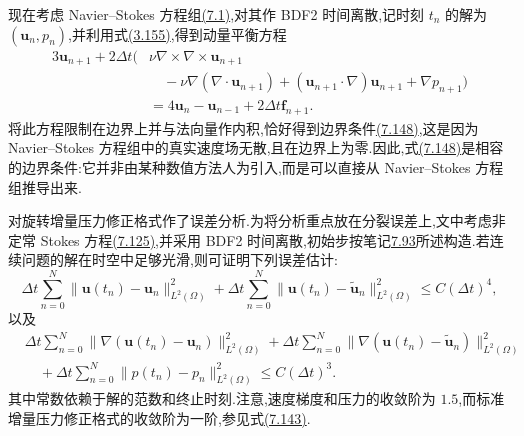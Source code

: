 \begin{note}[旋转增量压力修正格式]
现在考虑 Navier--Stokes 方程组\hyperref[eq:time-dependent-ns-strong]{(7.1)},对其作 BDF2 时间离散,记时刻 $t_n$ 的解为 $(\bm{u}_n,p_n)$,并利用式\hyperref[eq:curl-curl-3d]{(3.155)},得到动量平衡方程
\[
\begin{aligned}
 3\bm{u}_{n+1}+2\Delta t\bigl(&\nu\nabla\times\nabla\times\bm{u}_{n+1}\\
  &\quad-\nu\nabla(\nabla\cdot\bm{u}_{n+1})
       +(\bm{u}_{n+1}\cdot\nabla)\bm{u}_{n+1}
       +\nabla p_{n+1}\bigr)\\
 &=4\bm{u}_n-\bm{u}_{n-1}
   +2\Delta t\bm{f}_{n+1}.
\end{aligned}
\]
将此方程限制在边界上并与法向量作内积,恰好得到边界条件\hyperref[eq:rotational-pressure-boundary-condition]{(7.148)},这是因为 Navier--Stokes 方程组中的真实速度场无散,且在边界上为零.因此,式\hyperref[eq:rotational-pressure-boundary-condition]{(7.148)}是相容的边界条件:它并非由某种数值方法人为引入,而是可以直接从 Navier--Stokes 方程组推导出来.
\end{note}

\begin{note}[旋转增量压力修正格式的误差分析]
\label{note:rotational-incremental-pressure-correction-error}
\textcite{GuermondShen2004}对旋转增量压力修正格式作了误差分析.为将分析重点放在分裂误差上,文中考虑非定常 Stokes 方程\hyperref[eq:transient-stokes-stabilization]{(7.125)},并采用 BDF2 时间离散,初始步按笔记\hyperref[note:incremental-pressure-correction-bdf2-initial-step]{7.93}所述构造.若连续问题的解在时空中足够光滑,则可证明下列误差估计:
\[
\Delta t\sum_{n=0}^{N}
 \|\bm{u}(t_n)-\bm{u}_n\|_{L^2(\Omega)}^2
 +\Delta t\sum_{n=0}^{N}
 \|\bm{u}(t_n)-\widetilde{\bm{u}}_n\|_{L^2(\Omega)}^2
 \le C(\Delta t)^4,
\]
以及
\[
\begin{aligned}
 &\Delta t\sum_{n=0}^{N}
   \|\nabla(\bm{u}(t_n)-\bm{u}_n)\|_{L^2(\Omega)}^2
 +\Delta t\sum_{n=0}^{N}
   \|\nabla(\bm{u}(t_n)-\widetilde{\bm{u}}_n)\|_{L^2(\Omega)}^2\\
 &\quad+\Delta t\sum_{n=0}^{N}
   \|p(t_n)-p_n\|_{L^2(\Omega)}^2
 \le C(\Delta t)^3.
\end{aligned}
\]
其中常数依赖于解的范数和终止时刻.注意,速度梯度和压力的收敛阶为 $1.5$,而标准增量压力修正格式的收敛阶为一阶,参见式\hyperref[eq:incremental-pressure-correction-bdf2-error]{(7.143)}.
\end{note}

